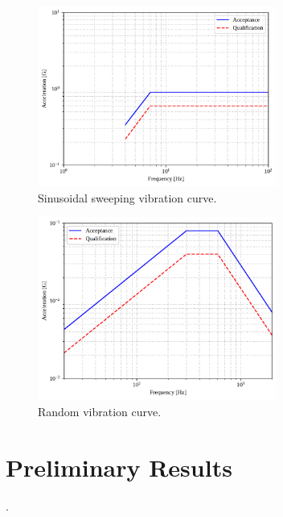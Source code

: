 
\begin{figure}[!ht]
    \begin{center}
        \includegraphics[width=0.7\textwidth]{figures/sine_test.pdf}
        \caption{Sinusoidal sweeping vibration curve.}
        \label{fig:vibration-sinusoidal-curve}
    \end{center}
\end{figure}

\begin{figure}[!ht]
    \begin{center}
        \includegraphics[width=0.7\textwidth]{figures/random_vibration.pdf}
        \caption{Random vibration curve.}
        \label{fig:vibration-test}
    \end{center}
\end{figure}

\section{Preliminary Results}

.
